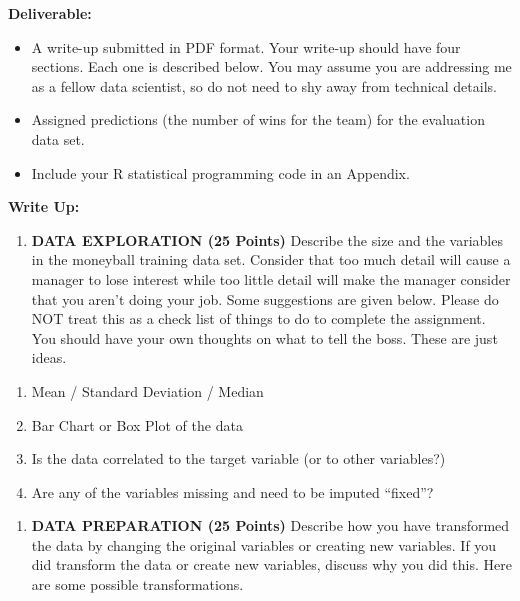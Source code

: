 \documentclass[
]{article}
\providecommand{\tightlist}{%
  \setlength{\itemsep}{0pt}\setlength{\parskip}{0pt}}
\begin{document}
\textbf{Deliverable:}

\begin{itemize}
\tightlist
\item
  A write-up submitted in PDF format. Your write-up should have four
  sections. Each one is described below. You may assume you are
  addressing me as a fellow data scientist, so do not need to shy away
  from technical details.
\item
  Assigned predictions (the number of wins for the team) for the
  evaluation data set.
\item
  Include your R statistical programming code in an Appendix.
\end{itemize}

\textbf{Write Up:}

\begin{enumerate}
\def\labelenumi{\arabic{enumi}.}
\tightlist
\item
  \textbf{DATA EXPLORATION (25 Points)} Describe the size and the
  variables in the moneyball training data set. Consider that too much
  detail will cause a manager to lose interest while too little detail
  will make the manager consider that you aren't doing your job. Some
  suggestions are given below. Please do NOT treat this as a check list
  of things to do to complete the assignment. You should have your own
  thoughts on what to tell the boss. These are just ideas.
\end{enumerate}

\begin{enumerate}
\def\labelenumi{\alph{enumi}.}
\tightlist
\item
  Mean / Standard Deviation / Median
\item
  Bar Chart or Box Plot of the data
\item
  Is the data correlated to the target variable (or to other variables?)
\item
  Are any of the variables missing and need to be imputed ``fixed''?
\end{enumerate}

\begin{enumerate}
\def\labelenumi{\arabic{enumi}.}
\setcounter{enumi}{1}
\tightlist
\item
  \textbf{DATA PREPARATION (25 Points)} Describe how you have
  transformed the data by changing the original variables or creating
  new variables. If you did transform the data or create new variables,
  discuss why you did this. Here are some possible transformations.
\end{enumerate}
\end{document}
